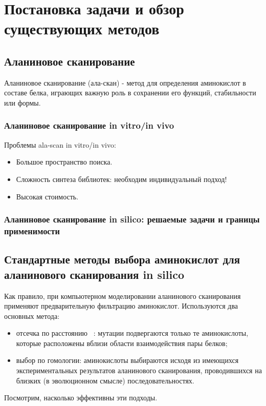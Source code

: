 \chapter{Постановка задачи и обзор существующих методов}

\section{Аланиновое сканирование}
Аланиновое сканирование (ала-скан) - метод для определения аминокислот в составе белка, играющих важную роль в сохранении его функций, стабильности или формы.
\subsection{Аланиновое сканирование in vitro/in vivo}
Проблемы ala-scan in vitro/in vivo:
\begin{itemize}
\item Большое пространство поиска.
\item Сложность синтеза библиотек: необходим индивидуальный подход!
\item Высокая стоимость.
\end{itemize}
\subsection{Аланиновое сканирование in silico: решаемые задачи и границы применимости}
\section{Стандартные методы выбора аминокислот для аланинового сканирования in silico}

Как правило, при компьютерном моделировании аланинового сканирования применяют предварительную фильтрацию аминокислот. Используются два основных метода:
\begin{itemize}
\item отсечка по расстоянию ~\cite{kortemme2004}: мутации подвергаются только те аминокислоты, которые расположены вблизи области взаимодействия пары белков;

\item выбор по гомологии: аминокислоты выбираются исходя из имеющихся экспериментальных результатов аланинового сканирования, проводившихся на близких (в эволюционном смысле) последовательностях.
\end{itemize}

Посмотрим, насколько эффективны эти подходы.


